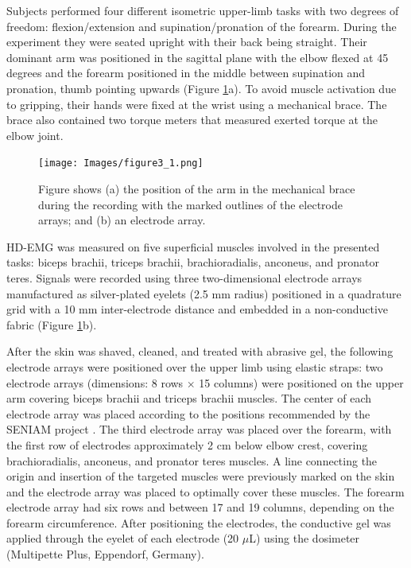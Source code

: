Subjects performed four different isometric upper-limb tasks with two degrees of freedom: flexion/extension and supination/pronation of the forearm. During the experiment they were seated upright with their back being straight. Their dominant arm was positioned in the sagittal plane with the elbow flexed at 45 degrees and the forearm positioned in the middle between supination and pronation, thumb pointing upwards (Figure \ref{fig:3-1}a). To avoid muscle activation due to gripping, their hands were fixed at the wrist using a mechanical brace. The brace also contained two torque meters that measured exerted torque at the elbow joint.

\begin{figure}[ht]
\centering
\texttt{[image: Images/figure3\_1.png]}
\caption{Figure shows (a) the position of the arm in the mechanical brace during the recording with the marked outlines of the electrode arrays; and (b) an electrode array.}
\label{fig:3-1}
\end{figure}      

HD-EMG was measured on five superficial muscles involved in the presented tasks: biceps brachii, triceps brachii, brachioradialis, anconeus, and pronator teres. Signals were recorded using three two-dimensional electrode arrays manufactured as silver-plated eyelets (2.5 mm radius) positioned in a quadrature grid with a 10 mm inter-electrode distance and embedded in a non-conductive fabric (Figure \ref{fig:3-1}b).

After the skin was shaved, cleaned, and treated with abrasive gel, the following electrode arrays were positioned over the upper limb using elastic straps: two electrode arrays (dimensions: 8 rows $\times$ 15 columns) were positioned on the upper arm covering biceps brachii and triceps brachii muscles. The center of each electrode array was placed according to the positions recommended by the SENIAM project \citep{Hermens1999}. The third electrode array was placed over the forearm, with the first row of electrodes approximately 2 cm below elbow crest, covering brachioradialis, anconeus, and pronator teres muscles. A line connecting the origin and insertion of the targeted muscles were previously marked on the skin and the electrode array was placed to optimally cover these muscles. The forearm electrode array had six rows and between 17 and 19 columns, depending on the forearm circumference. After positioning the electrodes, the conductive gel was applied through the eyelet of each electrode (20 $\mu$L) using the dosimeter (Multipette Plus, Eppendorf, Germany).

